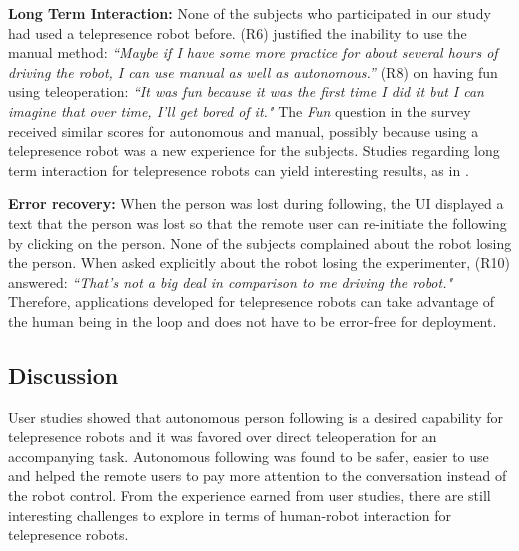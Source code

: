 \textbf{Long Term Interaction:} None of the subjects who participated in our study had used a telepresence robot before. (R6) justified the inability to use the manual method: \emph{``Maybe if I have some more practice for about several hours of driving the robot, I can use manual as well as autonomous.''} (R8) on having fun using teleoperation: \emph{``It was fun because it was the first time I did it but I can imagine that over time, I'll get bored of it."} The \emph{Fun} question in the survey received similar scores for autonomous and manual, possibly because using a telepresence robot was a new experience for the subjects. Studies regarding long term interaction for telepresence robots can yield interesting results, as in \cite{lee2011now}.

\textbf{Error recovery:} When the person was lost during following, the UI displayed a text that the person was lost so that the remote user can re-initiate the following by clicking on the person. None of the subjects complained about the robot losing the person. When asked explicitly about the robot losing the experimenter, (R10) answered: \emph{``That's not a big deal in comparison to me driving the robot."} Therefore, applications developed for telepresence robots can take advantage of the human being in the loop and does not have to be error-free for deployment.

\subsection{Discussion}

User studies showed that autonomous person following
is a desired capability for telepresence robots and it was
favored over direct teleoperation for an accompanying task.
Autonomous following was found to be safer, easier to use
and helped the remote users to pay more attention to the
conversation instead of the robot control. From the experience
earned from user studies, there are still interesting
challenges to explore in terms of human-robot interaction for
telepresence robots.

